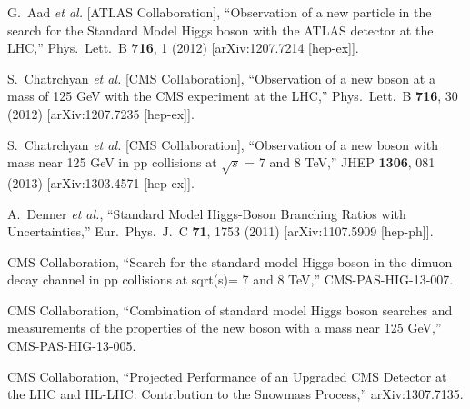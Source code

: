 \documentclass[10pt]{article}
\begin{document}
\begin{thebibliography}{99}


  G.~Aad {\it et al.}  [ATLAS Collaboration],
  ``Observation of a new particle in the search for the Standard Model Higgs boson with the ATLAS detector at the LHC,''
  Phys.\ Lett.\ B {\bf 716}, 1 (2012)
  [arXiv:1207.7214 [hep-ex]].
  
  S.~Chatrchyan {\it et al.}  [CMS Collaboration],
  ``Observation of a new boson at a mass of 125 GeV with the CMS experiment at the LHC,''
  Phys.\ Lett.\ B {\bf 716}, 30 (2012)
  [arXiv:1207.7235 [hep-ex]].

  S.~Chatrchyan {\it et al.}  [CMS Collaboration],
  ``Observation of a new boson with mass near 125 GeV in pp collisions at $\sqrt{s}$ = 7 and 8 TeV,''
  JHEP {\bf 1306}, 081 (2013)
  [arXiv:1303.4571 [hep-ex]].

  A.~Denner {\it et al.},
  ``Standard Model Higgs-Boson Branching Ratios with Uncertainties,''
  Eur.\ Phys.\ J.\ C {\bf 71}, 1753 (2011)
  [arXiv:1107.5909 [hep-ph]].


  CMS Collaboration,
  ``Search for the standard model Higgs boson in the dimuon decay channel 
in pp collisions at sqrt(s)= 7 and 8 TeV,''
  CMS-PAS-HIG-13-007.

  CMS Collaboration,
  ``Combination of standard model Higgs boson searches and measurements of the properties of the new boson with a mass near 125 GeV,''
  CMS-PAS-HIG-13-005.

  CMS Collaboration,
  ``Projected Performance of an Upgraded CMS Detector at the LHC and HL-LHC: Contribution to the Snowmass Process,''
  arXiv:1307.7135.


\end{thebibliography}

 
\end{document}
